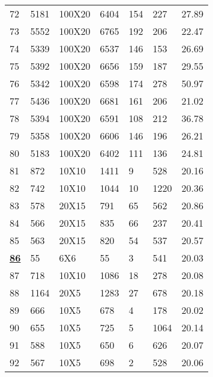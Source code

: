 \documentclass[14pt]{acmsiggraph}
\begin{document}
\begin{table}[h!]
\begin{center}
{\begin{tabular}{||lllllll}
					72  & 5181 & 100X20 & \cellcolor[rgb]{0.7,0.79,0.38}6404  & 154 & 227  & 27.89 \\
					73  & 5552 & 100X20 & \cellcolor[rgb]{0.68,0.78,0.38}6765 & 192 & 206  & 22.47 \\
					74  & 5339 & 100X20 & \cellcolor[rgb]{0.69,0.78,0.38}6537 & 146 & 153  & 26.69 \\
					75  & 5392 & 100X20 & \cellcolor[rgb]{0.7,0.79,0.38}6656  & 159 & 187  & 29.55 \\
					76  & 5342 & 100X20 & \cellcolor[rgb]{0.7,0.79,0.38}6598  & 174 & 278  & 50.97 \\
					77  & 5436 & 100X20 & \cellcolor[rgb]{0.69,0.78,0.38}6681 & 161 & 206  & 21.02 \\
					78  & 5394 & 100X20 & \cellcolor[rgb]{0.68,0.78,0.38}6591 & 108 & 212  & 36.78 \\
					79  & 5358 & 100X20 & \cellcolor[rgb]{0.69,0.78,0.38}6606 & 146 & 196  & 26.21 \\
					80  & 5183 & 100X20 & \cellcolor[rgb]{0.7,0.79,0.38}6402  & 111 & 136  & 24.81 \\
					81  & 872  & 10X10  & \cellcolor[rgb]{1,0.7,0.39}1411     & 9   & 528  & 20.16 \\
					82  & 742  & 10X10  & \cellcolor[rgb]{0.89,0.87,0.47}1044 & 10  & 1220 & 20.36 \\
					83  & 578  & 20X15  & \cellcolor[rgb]{0.85,0.85,0.45}791  & 65  & 562  & 20.86 \\
					84  & 566  & 20X15  & \cellcolor[rgb]{0.96,0.9,0.5}835    & 66  & 237  & 20.41 \\
					85  & 563  & 20X15  & \cellcolor[rgb]{0.94,0.89,0.49}820  & 54  & 537  & 20.57 \\
					\underline{\textbf{86}}  & 55   & 6X6    & \cellcolor[rgb]{0.43,0.67,0.27}55   & 3   & 541  & 20.03 \\
					87  & 718  & 10X10  & \cellcolor[rgb]{1,0.9,0.5}1086      & 18  & 278  & 20.08 \\
					88  & 1164 & 20X5   & \cellcolor[rgb]{0.55,0.72,0.32}1283 & 27  & 678  & 20.18 \\
					89  & 666  & 10X5   & \cellcolor[rgb]{0.45,0.68,0.28}678  & 4   & 178  & 20.02 \\
					90  & 655  & 10X5   & \cellcolor[rgb]{0.55,0.72,0.32}725  & 5   & 1064 & 20.14 \\
					91  & 588  & 10X5   & \cellcolor[rgb]{0.55,0.72,0.32}650  & 6   & 626  & 20.07 \\
					92  & 567  & 10X5   & \cellcolor[rgb]{0.69,0.78,0.38}698  & 2   & 528  & 20.06 \\

\end{tabular}}
\end{center}
\end{table}
\end{document}
